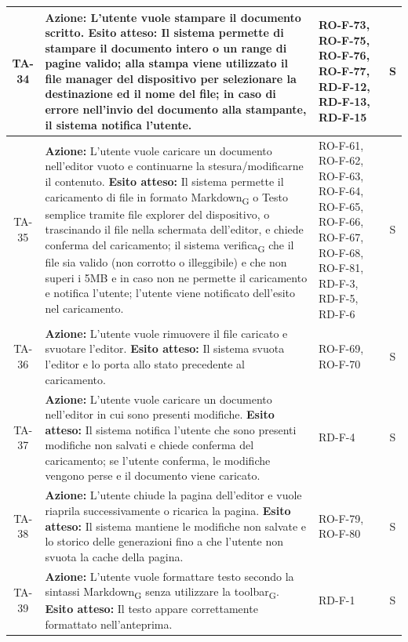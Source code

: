\documentclass[11pt,a4paper]{article}
\newcommand{\gls}[1]{#1\textsubscript{G}}
\begin{document}
\begin{longtable}{|c|p{9cm}|p{3cm}|c|}
\hline
TA-34 & \textbf{Azione:} L'utente vuole stampare il documento scritto. \newline \textbf{Esito atteso:} Il sistema permette di stampare il documento intero o un range di pagine valido; alla stampa viene utilizzato il file manager del dispositivo per selezionare la destinazione ed il nome del file; in caso di errore nell'invio del documento alla stampante, il sistema notifica l'utente. & RO-F-73, RO-F-75, RO-F-76, RO-F-77, RD-F-12, RD-F-13, RD-F-15 & S \\
\hline
TA-35 & \textbf{Azione:} L'utente vuole caricare un documento nell'editor vuoto e continuarne la stesura/modificarne il contenuto. \newline \textbf{Esito atteso:} Il sistema permette il caricamento di file in formato \gls{Markdown} o Testo semplice tramite file explorer del dispositivo, o trascinando il file nella schermata dell'editor, e chiede conferma del caricamento; il sistema \gls{verifica} che il file sia valido (non corrotto o illeggibile) e che non superi i 5MB e in caso non ne permette il caricamento e notifica l'utente; l'utente viene notificato dell'esito nel caricamento. & RO-F-61, RO-F-62, RO-F-63, RO-F-64, RO-F-65, RO-F-66, RO-F-67, RO-F-68, RO-F-81, RD-F-3, RD-F-5, RD-F-6 & S \\
\hline
TA-36 & \textbf{Azione:} L'utente vuole rimuovere il file caricato e svuotare l'editor. \newline \textbf{Esito atteso:} Il sistema svuota l'editor e lo porta allo stato precedente al caricamento. & RO-F-69, RO-F-70 & S \\
\hline
TA-37 & \textbf{Azione:} L'utente vuole caricare un documento nell'editor in cui sono presenti modifiche. \newline \textbf{Esito atteso:} Il sistema notifica l'utente che sono presenti modifiche non salvati e chiede conferma del caricamento; se l'utente conferma, le modifiche vengono perse e il documento viene caricato. & RD-F-4 & S \\
\hline
TA-38 & \textbf{Azione:} L'utente chiude la pagina dell'editor e vuole riaprila successivamente o ricarica la pagina. \newline \textbf{Esito atteso:} Il sistema mantiene le modifiche non salvate e lo storico delle generazioni fino a che l'utente non svuota la cache della pagina. & RO-F-79, RO-F-80 & S \\
\hline
TA-39 & \textbf{Azione:} L'utente vuole formattare testo secondo la sintassi \gls{Markdown} senza utilizzare la \gls{toolbar}. \newline \textbf{Esito atteso:} Il testo appare correttamente formattato nell'anteprima. & RD-F-1 & S \\

\end{longtable}
\end{document}
